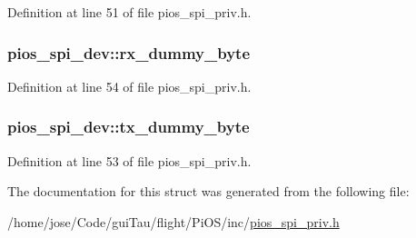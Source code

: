 Definition at line 51 of file pios\-\_\-spi\-\_\-priv.\-h.

\hypertarget{structpios__spi__dev_a003d648a4e5f69fab071c4ed53059418}{
\subsubsection[{rx\-\_\-dummy\-\_\-byte}]{ pios\-\_\-spi\-\_\-dev\-::rx\-\_\-dummy\-\_\-byte}}\label{structpios__spi__dev_a003d648a4e5f69fab071c4ed53059418}


Definition at line 54 of file pios\-\_\-spi\-\_\-priv.\-h.

\hypertarget{structpios__spi__dev_a72b66190a7211a66c58fdc359c742438}{
\subsubsection[{tx\-\_\-dummy\-\_\-byte}]{ pios\-\_\-spi\-\_\-dev\-::tx\-\_\-dummy\-\_\-byte}}\label{structpios__spi__dev_a72b66190a7211a66c58fdc359c742438}


Definition at line 53 of file pios\-\_\-spi\-\_\-priv.\-h.



The documentation for this struct was generated from the following file\-:\begin{DoxyCompactItemize}
\item 
/home/jose/\-Code/gui\-Tau/flight/\-Pi\-O\-S/inc/\hyperlink{pios__spi__priv_8h}{pios\-\_\-spi\-\_\-priv.\-h}\end{DoxyCompactItemize}
